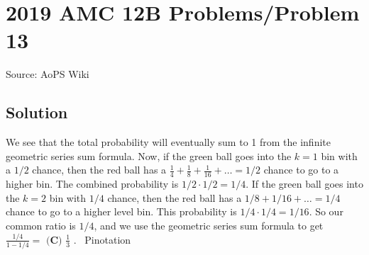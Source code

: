 \documentclass[12pt]{article}
\begin{document}
\section*{{2019 AMC 12B Problems/Problem 13}}
Source: AoPS Wiki

\subsection*{Solution}
We see that the total probability will eventually sum to 1 from the infinite geometric series sum formula. Now, if the green ball goes into the \( k=1 \) bin with a \( 1/2 \) chance, then the red ball has a \( \frac{1}{4} + \frac{1}{8} + \frac{1}{16} + \dots = 1/2 \) chance to go to a higher bin. The combined probability is \( 1/2 \cdot 1/2 = 1/4 \). If the green ball goes into the \( k=2 \) bin with \( 1/4 \) chance, then the red ball has a \( 1/8 + 1/16 + \dots = 1/4 \) chance to go to a higher level bin. This probability is \( 1/4 \cdot 1/4 = 1/16 \). So our common ratio is \( 1/4 \), and we use the geometric series sum formula to get \( \frac{1/4}{1 - 1/4} = \) $\boxed{\textbf{(C) } \frac{1}{3}}$ . ~Pinotation
\end{document}
